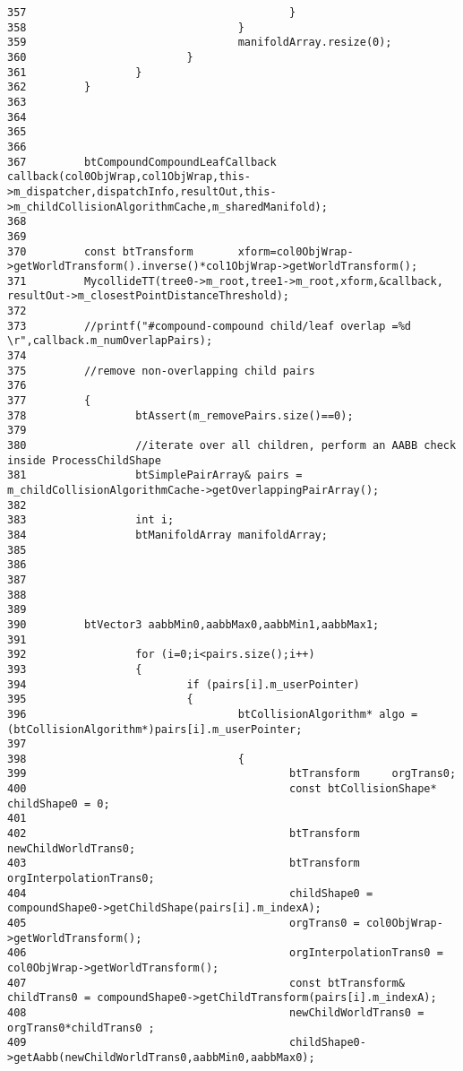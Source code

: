 \begin{Code}
\begin{verbatim}
357                                         }
358                                 }
359                                 manifoldArray.resize(0);
360                         }
361                 }
362         }
363 
364 
365         
366 
367         btCompoundCompoundLeafCallback callback(col0ObjWrap,col1ObjWrap,this->m_dispatcher,dispatchInfo,resultOut,this->m_childCollisionAlgorithmCache,m_sharedManifold);
368 
369 
370         const btTransform       xform=col0ObjWrap->getWorldTransform().inverse()*col1ObjWrap->getWorldTransform();
371         MycollideTT(tree0->m_root,tree1->m_root,xform,&callback, resultOut->m_closestPointDistanceThreshold);
372 
373         //printf("#compound-compound child/leaf overlap =%d                      \r",callback.m_numOverlapPairs);
374 
375         //remove non-overlapping child pairs
376 
377         {
378                 btAssert(m_removePairs.size()==0);
379 
380                 //iterate over all children, perform an AABB check inside ProcessChildShape
381                 btSimplePairArray& pairs = m_childCollisionAlgorithmCache->getOverlappingPairArray();
382                 
383                 int i;
384                 btManifoldArray manifoldArray;
385         
386                 
387 
388         
389         
390         btVector3 aabbMin0,aabbMax0,aabbMin1,aabbMax1;        
391         
392                 for (i=0;i<pairs.size();i++)
393                 {
394                         if (pairs[i].m_userPointer)
395                         {
396                                 btCollisionAlgorithm* algo = (btCollisionAlgorithm*)pairs[i].m_userPointer;
397 
398                                 {
399                                         btTransform     orgTrans0;
400                                         const btCollisionShape* childShape0 = 0;
401                                         
402                                         btTransform     newChildWorldTrans0;
403                                         btTransform     orgInterpolationTrans0;
404                                         childShape0 = compoundShape0->getChildShape(pairs[i].m_indexA);
405                                         orgTrans0 = col0ObjWrap->getWorldTransform();
406                                         orgInterpolationTrans0 = col0ObjWrap->getWorldTransform();
407                                         const btTransform& childTrans0 = compoundShape0->getChildTransform(pairs[i].m_indexA);
408                                         newChildWorldTrans0 = orgTrans0*childTrans0 ;
409                                         childShape0->getAabb(newChildWorldTrans0,aabbMin0,aabbMax0);

\end{verbatim}
\end{Code}
